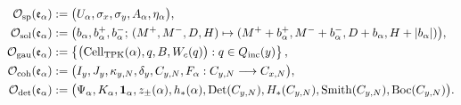 \begin{align}
 \mathcal O_{\rm sp}(\mathfrak e_\alpha)
 &:=
 \bigl(U_\alpha,\sigma_x,\sigma_y,
 A_\alpha,\eta_\alpha\bigr),
 \label{eq:pdfv2-cor-accion-sp}\\
 \mathcal O_{\rm sol}(\mathfrak e_\alpha)
 &:=
 \bigl(b_\alpha,b_\alpha^+,b_\alpha^-;\,
 (M^+,M^-,D,H)\mapsto
 (M^++b_\alpha^+,M^-+b_\alpha^-,
  D+b_\alpha,H+|b_\alpha|)\bigr),
 \label{eq:pdfv2-cor-accion-sol}\\
 \mathcal O_{\rm gau}(\mathfrak e_\alpha)
 &:=
 \left\{
 \bigl(\operatorname{Cell}_{\rm TPK}(\alpha),
 q,B,W_c(q)\bigr):
 q\in Q_{\rm inc}(y)
 \right\},
 \label{eq:pdfv2-cor-accion-gau}\\
 \mathcal O_{\rm coh}(\mathfrak e_\alpha)
 &:=
 \bigl(I_y,J_y,\kappa_{y,N},\delta_y,C_{y,N},
 F_\alpha:C_{y,N}\longrightarrow C_{x,N}\bigr),
 \label{eq:pdfv2-cor-accion-coh}\\
 \mathcal O_{\rm det}(\mathfrak e_\alpha)
 &:=
 \bigl(\Psi_\alpha,K_\alpha,\mathbf1_\alpha,z_\pm(\alpha),
 h_*(\alpha),\operatorname{Det}(C_{y,N}),H_*(C_{y,N}),
 \operatorname{Smith}(C_{y,N}),\operatorname{Boc}(C_{y,N})\bigr).
 \label{eq:pdfv2-cor-accion-det}
\end{align}

